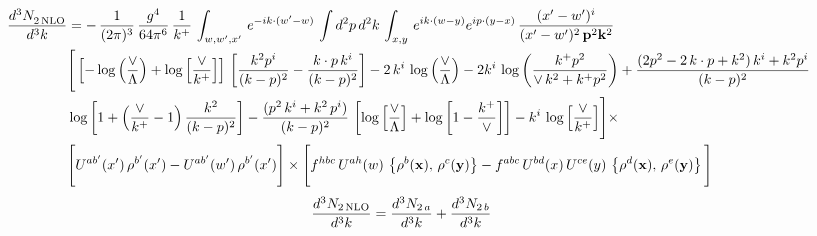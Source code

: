 \documentclass[9pt]{article}
\numberwithin{equation}{section}
\begin{document}
\begin{align}
   \frac{d^{3}N_{2\,\rm NLO}^{\rm}}{d^{3}k} &  = -\,\frac{1}{(2\pi)^{3}}\,\frac{g^{4}}{64\pi^{6}}\, \frac{1}{k^{+}}\,\int_{w,w',x'}\, e^{-ik\cdot (w'-w)}\,\int d^{2}p\,d^{2}k\,\int_{x,y}\, e^{ik\cdot (w-y)} e^{ip\cdot (y-x)}\, \frac{(x'-w')^{i}}{(x'-w')^{2}\,\mathbf{p}^{2}\mathbf{k}^{2} }\notag \\ & \Bigg[\left[-\log{\left(\frac{\vee}{\Lambda}\right)}+\log{\left[\frac{\vee}{k^{+}}\right]}\right]\,\left[\frac{k^{2}p^{i}}{(k-p)^{2}}-\frac{k\cdot p\,k^{i}}{(k-p)^{2}}\right]-2\,k^{i}\,\log{\left(\frac{\vee}{\Lambda}\right)} -2k^{i}\,\log{\left(\frac{k^{+}p^{2}}{\vee\, k^{2}+k^{+}p^{2}}\right)}+\frac{(2p^{2}-2\,k\cdot p + k^{2})\,k^{i} + k^{2}p^{i}}{(k-p)^{2}}\notag \\ &  \log{\left[1+\left(\frac{\vee}{k^{+}}-1\right)\frac{k^{2}}{(k-p)^{2}}\right]} - \frac{(p^{2}\,k^{i}+k^{2}\,p^{i})}{(k-p)^{2}}\,\left[\log{\left[\frac{\vee}{\Lambda}\right]}+\log{\left[1-\frac{k^{+}}{\vee}\right]}\right]-k^{i}\,\log{\left[\frac{\vee}{k^{+}}\right]}\Bigg]\times\,\notag \\ &  \Bigg[U^{ab'}(x')\,\rho^{b'}(x') - U^{ab'}(w')\,\rho^{b'}(x')\Bigg]\times\Bigg[f^{hbc}\,U^{ah}(w)\,\left\{ \rho^{b}(\mathbf{x}),\,\rho^{c}(\mathbf{y})\right\}-f^{abc}\,U^{bd}(x)\, U^{ce}(y)\, \left\{\rho^{d}(\mathbf{x}),\,\rho^{e}(\mathbf{y})\right\}\Bigg]
\end{align}
\begin{align}
\frac{d^{3}N_{2\,\rm NLO}}{d^{3}k} &= \frac{d^{3}N_{2\,a}}{d^{3}k} + \frac{d^{3}N_{2\,b}}{d^{3}k}
\end{align}
\end{document}
